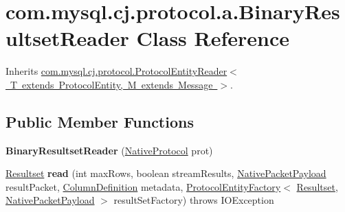 \hypertarget{classcom_1_1mysql_1_1cj_1_1protocol_1_1a_1_1_binary_resultset_reader}{}\section{com.\+mysql.\+cj.\+protocol.\+a.\+Binary\+Resultset\+Reader Class Reference}
\label{classcom_1_1mysql_1_1cj_1_1protocol_1_1a_1_1_binary_resultset_reader}


Inherits \mbox{\hyperlink{interfacecom_1_1mysql_1_1cj_1_1protocol_1_1_protocol_entity_reader}{com.\+mysql.\+cj.\+protocol.\+Protocol\+Entity\+Reader$<$ T extends Protocol\+Entity, M extends Message $>$}}.

\subsection*{Public Member Functions}
\begin{DoxyCompactItemize}
\item 
\mbox{\label{classcom_1_1mysql_1_1cj_1_1protocol_1_1a_1_1_binary_resultset_reader_ae07fe98123b2431ae583c3435f7f1d69}} 
{\bfseries Binary\+Resultset\+Reader} (\mbox{\hyperlink{classcom_1_1mysql_1_1cj_1_1protocol_1_1a_1_1_native_protocol}{Native\+Protocol}} prot)
\item 
\mbox{\label{classcom_1_1mysql_1_1cj_1_1protocol_1_1a_1_1_binary_resultset_reader_afa8678031f1a28a920214b2402f2abde}} 
\mbox{\hyperlink{interfacecom_1_1mysql_1_1cj_1_1protocol_1_1_resultset}{Resultset}} {\bfseries read} (int max\+Rows, boolean stream\+Results, \mbox{\hyperlink{classcom_1_1mysql_1_1cj_1_1protocol_1_1a_1_1_native_packet_payload}{Native\+Packet\+Payload}} result\+Packet, \mbox{\hyperlink{interfacecom_1_1mysql_1_1cj_1_1protocol_1_1_column_definition}{Column\+Definition}} metadata, \mbox{\hyperlink{interfacecom_1_1mysql_1_1cj_1_1protocol_1_1_protocol_entity_factory}{Protocol\+Entity\+Factory}}$<$ \mbox{\hyperlink{interfacecom_1_1mysql_1_1cj_1_1protocol_1_1_resultset}{Resultset}}, \mbox{\hyperlink{classcom_1_1mysql_1_1cj_1_1protocol_1_1a_1_1_native_packet_payload}{Native\+Packet\+Payload}} $>$ result\+Set\+Factory)  throws I\+O\+Exception 
\end{DoxyCompactItemize}
